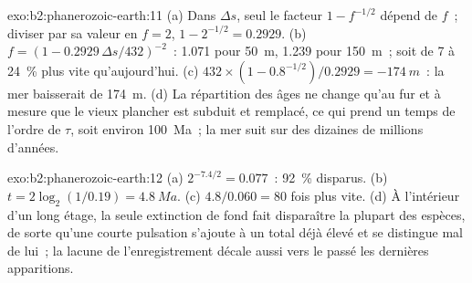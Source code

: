 \begin{solution}{exo:b2:phanerozoic-earth:11}
(a) Dans $\Delta s$, seul le facteur $1 - f^{-1/2}$ dépend de $f$~; diviser par sa valeur en $f = 2$,
$1 - 2^{-1/2} = 0.2929$. (b) $f = (1 - 0.2929\,\Delta s/432)^{-2}$~: 1.071 pour \qty{50}{m}, 1.239
pour \qty{150}{m}~; soit de 7 à \qty{24}{\percent} plus vite qu'aujourd'hui. (c) $432 \times (1 -
0.8^{-1/2})/0.2929 = \qty{-174}{m}$~: la mer baisserait de \qty{174}{m}. (d) La répartition des âges
ne change qu'au fur et à mesure que le vieux plancher est subduit et remplacé, ce qui prend un temps de l'ordre de $\tau$,
soit environ \qty{100}{Ma}~; la mer suit sur des dizaines de millions d'années.
\end{solution}

\begin{solution}{exo:b2:phanerozoic-earth:12}
(a) $2^{-7.4/2} = 0.077$~: \qty{92}{\percent} disparus. (b) $t = 2\log_2(1/0.19) = \qty{4.8}{Ma}$.
(c) $4.8/0.060 = 80$ fois plus vite. (d) À l'intérieur d'un long étage, la seule extinction de fond fait disparaître
la plupart des espèces, de sorte qu'une courte pulsation s'ajoute à un total déjà élevé et se distingue mal de lui~; la
lacune de l'enregistrement décale aussi vers le passé les dernières apparitions.
\end{solution}

